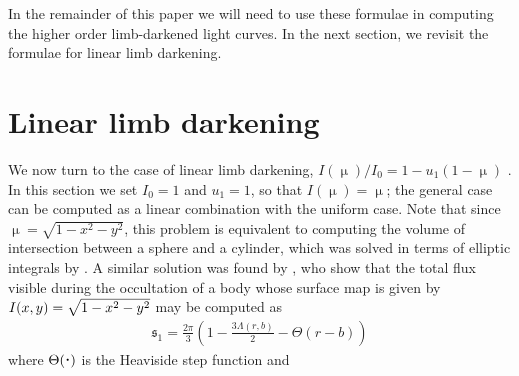 \documentclass[modern,trackchanges]{aastex63}
\begin{document}
In the remainder of this paper we will need to use these formulae in computing
the higher order limb-darkened light curves.  In the next section, we revisit the formulae
for linear limb darkening.

\section{Linear limb darkening}
\label{sec:reparam}

We now turn to the case of linear limb darkening, $I(\upmu)/I_0 = 1-u_1(1-\upmu)$
\citep{Russell1912a,Russell1912b}.  In this section we set $I_0=1$ and $u_1=1$, so
that $I(\upmu)=\upmu$;  the general case can be computed as a linear
combination with the uniform case.
Note that since $\upmu = \sqrt{1-x^2-y^2}$, this problem is equivalent to
computing the volume of intersection between a sphere and a cylinder, which was
solved in terms of elliptic integrals by \citet{Lamarche1990}.
A similar solution was found by \citet{MandelAgol2002}, who show that the total
flux visible during the occultation of a body whose surface map is given by
$I(x, y) = \sqrt{1 - \mbox{$x$}^2 -\mbox{$y$}^2}$ may be computed as
%
\begin{align}
    \label{eq:s1}
    \mathfrak{s}_1 = \frac{2\pi}{3} \left(1 - \frac{3\Lambda(r,b)}{2} - \Theta(r - b) \right)
\end{align}
%
where $\Theta(\bigdot)$ is the Heaviside step function and
%
\begingroup\makeatletter\def\f@size{10}\check@mathfonts
\def\maketag@@@#1{\hbox{\m@th\normalsize#1}}%
\end{document}
